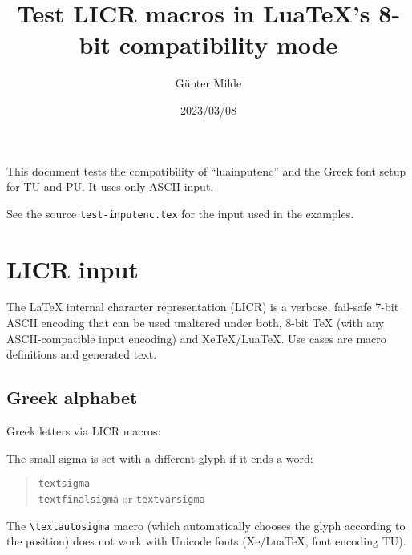 \documentclass[a4paper]{article}
\begin{document}
\hypersetup{pdfauthor=\textTau\'<\textepsilon\textsigma\textthetasymbol}

\title{Test LICR macros in LuaTeX's 8-bit compatibility mode}
\author{G\"unter Milde}
\date{2023/03/08}
\maketitle

This document tests the compatibility of ``luainputenc'' and the Greek font
setup for TU and PU. It uses only ASCII input.

See the source \texttt{test-inputenc.tex} for the input used in the examples.

\tableofcontents


\section{LICR input%
         \label{licr}}

The LaTeX internal character representation (LICR) is a verbose, fail-safe
7-bit ASCII encoding that can be used unaltered under both, 8-bit TeX (with
any ASCII-compatible input encoding) and XeTeX/LuaTeX.
Use cases are macro definitions and generated text.


\subsection{Greek alphabet}

Greek letters via LICR macros:
\begin{quote}
  \textAlpha{} \textBeta{} \textGamma{} \textDelta{} \textEpsilon{}
  \textZeta{} \textEta{} \textTheta{} \textIota{} \textKappa{}
  \textLambda{} \textMu{} \textNu{} \textXi{} \textOmicron{} \textPi{}
  \textRho{} \textSigma{} \textTau{} \textUpsilon{} \textPhi{}
  \textChi{} \textPsi{} \textOmega{}

  \textalpha{} \textbeta{} \textgamma{} \textdelta{} \textepsilon{}
  \textzeta{} \texteta{} \texttheta{} \textiota{} \textkappa{}
  \textlambda{} \textmu{} \textnu{} \textxi{} \textomicron{} \textpi{}
  \textrho{} \textsigma{} \texttau{} \textupsilon{}
  \textphi{} \textchi{} \textpsi{} \textomega{}
\end{quote}
The small sigma is set with a different
glyph if it ends a word:
\begin{quote}
  \textsigma{}       \verb|textsigma|\\
  \textfinalsigma{}  \verb|textfinalsigma| or \verb|textvarsigma|
\end{quote}
%
The \verb|\textautosigma| macro (which automatically chooses the glyph
according to the position) does not work with Unicode fonts (Xe/LuaTeX, font
encoding TU).
\end{document}
